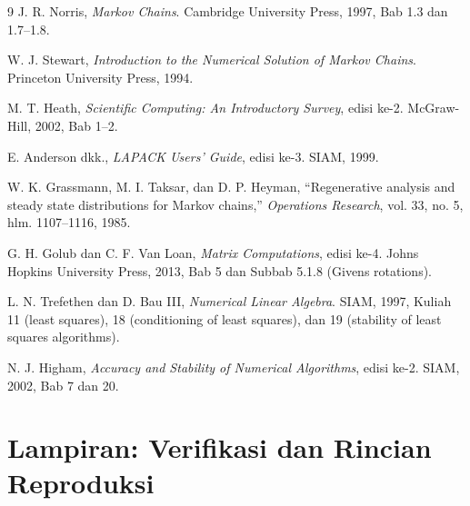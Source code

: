 \documentclass[12pt,a4paper]{article}
\numberwithin{equation}{section}
\begin{document}
\clearpage
\renewcommand{\refname}{Referensi}
\begin{thebibliography}{9}
 J. R. Norris, \emph{Markov Chains}. Cambridge University Press, 1997, Bab 1.3 dan 1.7--1.8.\par
{} W. J. Stewart, \emph{Introduction to the Numerical Solution of Markov Chains}. Princeton University Press, 1994.\par
{} M. T. Heath, \emph{Scientific Computing: An Introductory Survey}, edisi ke-2. McGraw-Hill, 2002, Bab 1--2.\par
{} E. Anderson dkk., \emph{LAPACK Users' Guide}, edisi ke-3. SIAM, 1999.\par
{} W. K. Grassmann, M. I. Taksar, dan D. P. Heyman, ``Regenerative analysis and steady state distributions for Markov chains,'' \emph{Operations Research}, vol. 33, no. 5, hlm. 1107--1116, 1985.\par
{} G. H. Golub dan C. F. Van Loan, \emph{Matrix Computations}, edisi ke-4. Johns Hopkins University Press, 2013, Bab 5 dan Subbab 5.1.8 (Givens rotations).\par
{} L. N. Trefethen dan D. Bau III, \emph{Numerical Linear Algebra}. SIAM, 1997, Kuliah 11 (least squares), 18 (conditioning of least squares), dan 19 (stability of least squares algorithms).\par
{} N. J. Higham, \emph{Accuracy and Stability of Numerical Algorithms}, edisi ke-2. SIAM, 2002, Bab 7 dan 20.\par
\end{thebibliography}
\clearpage
\appendix
\renewcommand{\thelstlisting}{A.\arabic{lstlisting}}
\section{Lampiran: Verifikasi dan Rincian Reproduksi}
\end{document}
